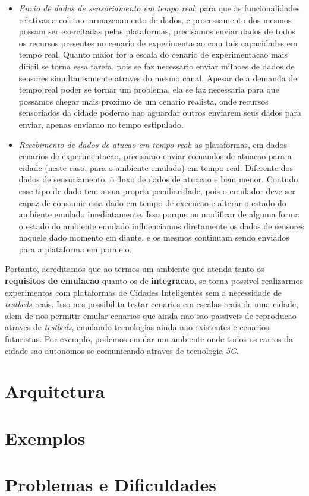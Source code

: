 \begin{itemize}
    \item \textit{Envio de dados de sensoriamento em tempo real}: para que as funcionalidades relativas a coleta e armazenamento de dados, e processamento dos mesmos possam ser
        exercitadas pelas plataformas, precisamos enviar dados de todos os recursos presentes no cenario de experimentacao com tais capacidades em tempo real.
        Quanto maior for a escala do cenario de experimentacao mais dificil se torna essa tarefa, pois se faz necessario enviar milhoes de dados de sensores simultaneamente atraves
        do mesmo canal.
        Apesar de a demanda de tempo real poder se tornar um problema, ela se faz necessaria para que possamos chegar mais proximo de um cenario realista, onde recursos sensoriados
        da cidade poderao nao aguardar outros enviarem seus dados para enviar, apenas enviarao no tempo estipulado.

    \item \textit{Recebimento de dados de atucao em tempo real}: as plataformas, em dados cenarios de experimentacao, precisarao enviar comandos de atuacao para a cidade (neste caso,
        para o ambiente emulado) em tempo real.
        Diferente dos dados de sensoriamento, o fluxo de dados de atuacao e bem menor.
        Contudo, esse tipo de dado tem a sua propria peculiaridade, pois o emulador deve ser capaz de consumir essa dado em tempo de execucao e alterar o estado do ambiente emulado
        imediatamente.
        Isso porque ao modificar de alguma forma o estado do ambiente emulado influenciamos diretamente os dados de sensores naquele dado momento em diante, e os mesmos continuam
        sendo enviados para a plataforma em paralelo.
\end{itemize}

Portanto, acreditamos que ao termos um ambiente que atenda tanto os \textbf{requisitos de emulacao} quanto os de \textbf{integracao}, se torna possivel realizarmos experimentos
com plataformas de Cidades Inteligentes sem a necessidade de \textit{testbeds} reais.
Isso nos possibilita testar cenarios em escalas reais de uma cidade, alem de nos permitir emular cenarios que ainda nao sao passiveis de reproducao atraves de \textit{testbeds},
emulando tecnologias ainda nao existentes e cenarios futuristas.
Por exemplo, podemos emular um ambiente onde todos os carros da cidade sao autonomos se comunicando atraves de tecnologia \textit{5G}.

\section{Arquitetura}
\section{Exemplos}
\section{Problemas e Dificuldades}
